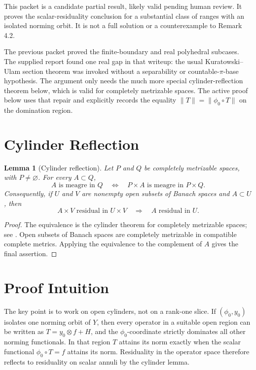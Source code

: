 \documentclass[11pt]{article}
\newtheorem{lemma}{Lemma}
\newcommand{\norm}[1]{\lVert #1\rVert}
\begin{document}
This packet is a candidate partial result, likely valid pending human review.
It proves the scalar-residuality conclusion for a substantial class of ranges
with an isolated norming orbit.  It is not a full solution or a counterexample
to Remark 4.2.

The previous packet proved the finite-boundary and real polyhedral subcases.
The supplied report found one real gap in that writeup: the usual
Kuratowski--Ulam section theorem was invoked without a separability or
countable-\(\pi\)-base hypothesis.  The argument only needs the much more
special cylinder-reflection theorem below, which is valid for completely
metrizable spaces.  The active proof below uses that repair and explicitly
records the equality \(\norm T=\norm{\phi_0\circ T}\) on the domination
region.

\section*{Cylinder Reflection}

\begin{lemma}[Cylinder reflection]\label{lem:cylinder}
Let \(P\) and \(Q\) be completely metrizable spaces, with \(P\neq\varnothing\).
For every \(A\subset Q\),
\[
 A\text{ is meagre in }Q
 \quad\Longleftrightarrow\quad
 P\times A\text{ is meagre in }P\times Q.
\]
Consequently, if \(U\) and \(V\) are nonempty open subsets of Banach spaces and
\(A\subset U\), then
\[
 A\times V\text{ residual in }U\times V
 \quad\Longrightarrow\quad
 A\text{ residual in }U.
\]
\end{lemma}

\begin{proof}
The equivalence is the cylinder theorem for completely metrizable spaces; see
\cite[Lemma 4.3]{Brian}.  Open subsets of Banach spaces are completely
metrizable in compatible complete metrics.  Applying the equivalence to the
complement of \(A\) gives the final assertion.
\end{proof}

\section*{Proof Intuition}

The key point is to work on open cylinders, not on a rank-one slice.  If
\((\phi_0,y_0)\) isolates one norming orbit of \(Y\), then every operator in a
suitable open region can be written as \(T=y_0\otimes f+H\), and the
\(\phi_0\)-coordinate strictly dominates all other norming functionals.  In
that region \(T\) attains its norm exactly when the scalar functional
\(\phi_0\circ T=f\) attains its norm.  Residuality in the operator space
therefore reflects to residuality on scalar annuli by the cylinder lemma.
\end{document}
